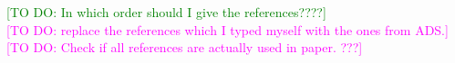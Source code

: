 \documentclass[iop,revtex4]{emulateapj}
\newcommand{\Wilma}[1]{\textcolor{Fuchsia}{#1}}
\newcommand{\HW}[1]{\textcolor{Green}{#1}}
\begin{document}
\HW{[TO DO: In which order should I give the references????]}
\\\Wilma{[TO DO: replace the references which I typed myself with the ones from ADS.]}
\\\Wilma{[TO DO: Check if all references are actually used in paper. ???]}

\end{document}

